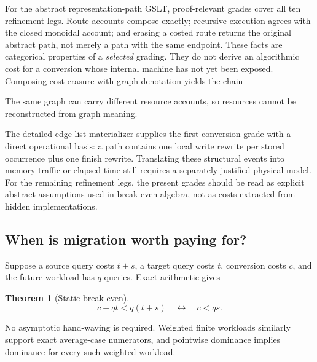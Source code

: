 \documentclass[11pt]{article}
\newtheorem{theorem}{Theorem}
\theoremstyle{remark}
\begin{document}
For the abstract representation-path GSLT, proof-relevant grades cover all ten
refinement legs.  Route accounts compose exactly; recursive execution agrees
with the closed monoidal account; and erasing a costed route returns the
original abstract path, not merely a path with the same endpoint.  These facts
are categorical properties of a \emph{selected} grading.  They do not derive
an algorithmic cost for a conversion whose internal machine has not yet been
exposed.  Composing cost erasure with graph denotation yields the chain
\begin{center}
\end{center}
The same graph can carry different resource accounts, so resources cannot be
reconstructed from graph meaning.

The detailed edge-list materializer supplies the first conversion grade with a
direct operational basis: a path contains one local write rewrite per stored
occurrence plus one finish rewrite.  Translating these structural events into
memory traffic or elapsed time still requires a separately justified physical
model.  For the remaining refinement legs, the present grades should be read
as explicit abstract assumptions used in break-even algebra, not as costs
extracted from hidden implementations.

\subsection{When is migration worth paying for?}

Suppose a source query costs \(t+s\), a target query costs \(t\), conversion
costs \(c\), and the future workload has \(q\) queries.  Exact arithmetic gives
\begin{theorem}[Static break-even]
\[
  c+qt<q(t+s)\quad\longleftrightarrow\quad c<qs.
\]
\end{theorem}
No asymptotic hand-waving is required.  Weighted finite workloads similarly
support exact average-case numerators, and pointwise dominance implies
dominance for every such weighted workload.
\end{document}

